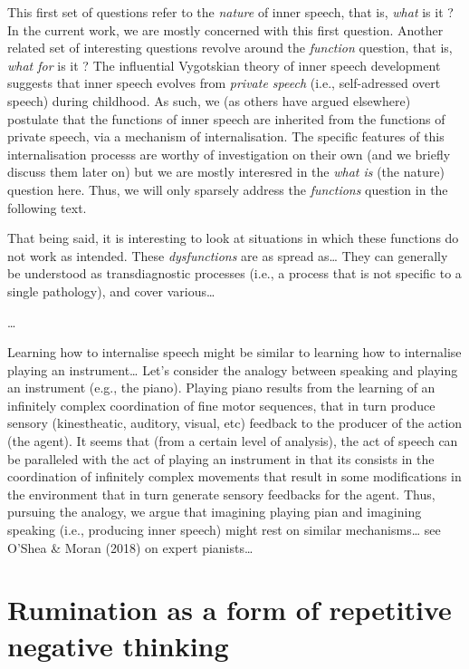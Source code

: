 \documentclass[a4paper,11pt,oneside,oldfontcommands]{memoir}
\begin{document}
This first set of questions refer to the \emph{nature} of inner speech,
that is, \emph{what} is it ? In the current work, we are mostly
concerned with this first question. Another related set of interesting
questions revolve around the \emph{function} question, that is,
\emph{what for} is it ? The influential Vygotskian theory of inner
speech development suggests that inner speech evolves from \emph{private
speech} (i.e., self-adressed overt speech) during childhood. As such, we
(as others have argued elsewhere) postulate that the functions of inner
speech are inherited from the functions of private speech, via a
mechanism of internalisation. The specific features of this
internalisation processs are worthy of investigation on their own (and
we briefly discuss them later on) but we are mostly interesred in the
\emph{what is} (the nature) question here. Thus, we will only sparsely
address the \emph{functions} question in the following text.

That being said, it is interesting to look at situations in which these
functions do not work as intended. These \emph{dysfunctions} \citep[that
can also be considered as
\emph{mis-exadaptation},][]{agnati_possible_2012} are as spread
as\ldots{} They can generally be understood as transdiagnostic processes
(i.e., a process that is not specific to a single pathology), and cover
various\ldots{}

\ldots{}

Learning how to internalise speech might be similar to learning how to
internalise playing an instrument\ldots{} Let's consider the analogy
between speaking and playing an instrument (e.g., the piano). Playing
piano results from the learning of an infinitely complex coordination of
fine motor sequences, that in turn produce sensory (kinestheatic,
auditory, visual, etc) feedback to the producer of the action (the
agent). It seems that (from a certain level of analysis), the act of
speech can be paralleled with the act of playing an instrument in that
its consists in the coordination of infinitely complex movements that
result in some modifications in the environment that in turn generate
sensory feedbacks for the agent. Thus, pursuing the analogy, we argue
that imagining playing pian and imagining speaking (i.e., producing
inner speech) might rest on similar mechanisms\ldots{} see O'Shea \&
Moran (2018) on expert pianists\ldots{}

\section{Rumination as a form of repetitive negative
thinking}\label{rumination-as-a-form-of-repetitive-negative-thinking}
\end{document}
